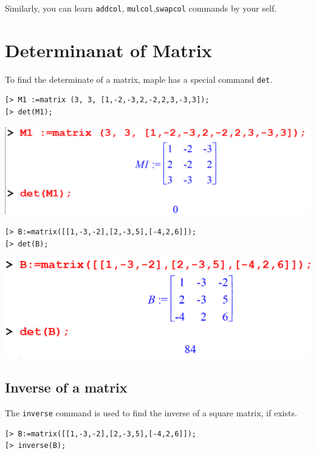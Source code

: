 \documentclass[
]{book}
\theoremstyle{definition}
\theoremstyle{definition}
\theoremstyle{definition}
\theoremstyle{definition}
\theoremstyle{remark}
\begin{document}
Similarly, you can learn \texttt{addcol}, \texttt{mulcol},\texttt{swapcol} commands by your self.

\section{Determinanat of Matrix}\label{determinanat-of-matrix}

To find the determinate of a matrix, maple has a special command \texttt{det}.

\begin{verbatim}
[> M1 :=matrix (3, 3, [1,-2,-3,2,-2,2,3,-3,3]);
[> det(M1);
\end{verbatim}

\includegraphics{figures/Lesson 4/fig12.png}

\begin{verbatim}
[> B:=matrix([[1,-3,-2],[2,-3,5],[-4,2,6]]);
[> det(B);
\end{verbatim}

\includegraphics{figures/Lesson 4/fig13.png}

\subsection{Inverse of a matrix}\label{inverse-of-a-matrix}

The \texttt{inverse} command is used to find the inverse of a square matrix, if exists.

\begin{verbatim}
[> B:=matrix([[1,-3,-2],[2,-3,5],[-4,2,6]]);
[> inverse(B);
\end{verbatim}
\end{document}
